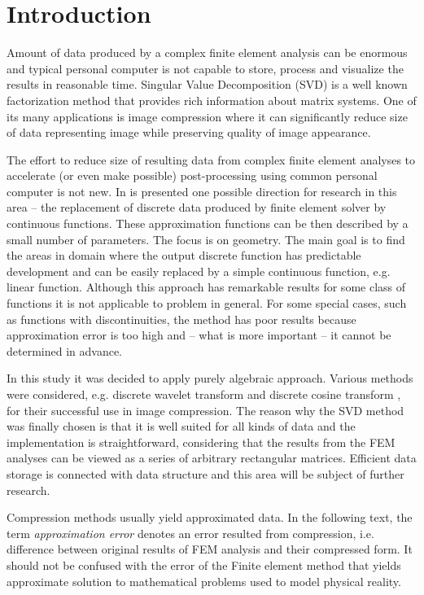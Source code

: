 \section{Introduction}
\label{sec:introduction}


Amount of data produced by a complex finite element analysis can be enormous and typical personal computer is not capable to store, process and visualize the results in reasonable time. Singular Value Decomposition (SVD) is a well known factorization method that provides rich information about matrix systems. One of its many applications is image compression where it can significantly reduce size of data representing image while preserving quality of image appearance.

The effort to reduce size of resulting data from complex finite element analyses to accelerate (or even make possible) post-processing using common personal computer is not new. In \cite{Benes2016} is presented one possible direction for research in this area -- the replacement of discrete data produced by finite element solver by continuous functions. These approximation functions can be then described by a small number of parameters. The focus is on geometry. The main goal is to find the areas in domain where the output discrete function has predictable development and can be easily replaced by a simple continuous function, e.g. linear function. Although this approach has remarkable results for some class of functions it is not applicable to problem in general. For some special cases, such as functions with discontinuities, the method has poor results because approximation error is too high and -- what is more important -- it cannot be determined in advance.

In this study it was decided to apply purely algebraic approach. Various methods were considered, e.g. discrete wavelet transform \cite{Lui2001} and discrete cosine transform \cite{Watson1994}, for their successful use in image compression. The reason why the SVD method was finally chosen is that it is well suited for all kinds of data and the implementation is straightforward, considering that the results from the FEM analyses can be viewed as a series of arbitrary rectangular matrices. Efficient data storage is connected with data structure \cite{Ivanyi2012, Ivanyi2014} and this area will be subject of further research.

Compression methods usually yield approximated data. In the following text, the term \textit{approximation error} denotes an error resulted from compression, i.e. difference between original results of FEM analysis and their compressed form. It should not be confused with the error of the Finite element method that yields approximate solution to mathematical problems used to model physical reality.

